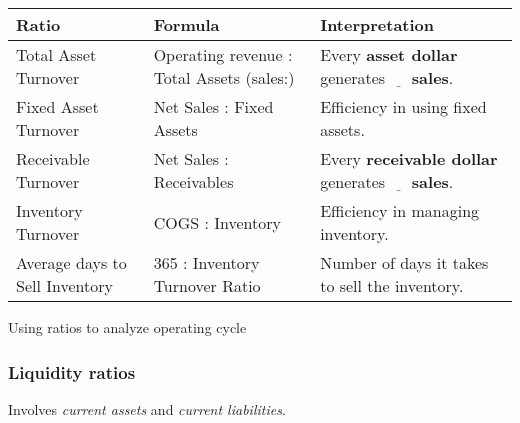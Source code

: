 \begin{table}[H]
    \centering
    \begin{tabular}{p{}p{}p{}}
        \hline
        \textbf{Ratio}                 & \textbf{Formula}                          & \textbf{Interpretation}                                                               \\
        \hline
        Total Asset Turnover           & Operating revenue : Total Assets (sales:) & Every \textbf{asset dollar} generates $\underline{\hspace{1em}}$ \textbf{sales}.      \\
        \hline
        Fixed Asset Turnover           & Net Sales : Fixed Assets                  & Efficiency in using fixed assets.                                                     \\
        \hline
        Receivable Turnover            & Net Sales : Receivables                   & Every \textbf{receivable dollar} generates $\underline{\hspace{1em}}$ \textbf{sales}. \\
        \hline
        Inventory Turnover             & COGS : Inventory                          & Efficiency in managing inventory.                                                     \\
        \hline
        Average days to Sell Inventory & 365 : Inventory Turnover Ratio            & Number of days it takes to sell the inventory.                                        \\
        \hline
    \end{tabular}
\end{table}

Using ratios to analyze operating cycle

\subsubsection{Liquidity ratios}

Involves \textit{current assets} and \textit{current liabilities}.

